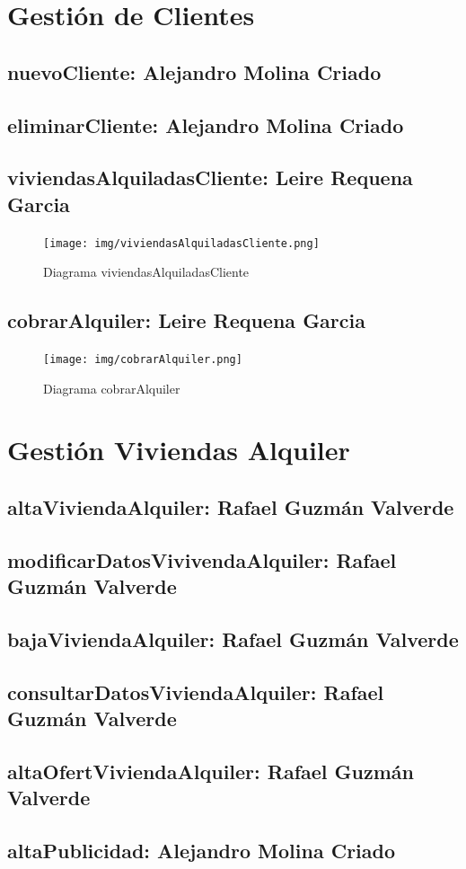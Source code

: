 \section{Gestión de Clientes}
\subsection{nuevoCliente: Alejandro Molina Criado}
\subsection{eliminarCliente: Alejandro Molina Criado}
\subsection{viviendasAlquiladasCliente: Leire Requena Garcia}
\begin{figure}[!h]
  \centering
    \texttt{[image: img/viviendasAlquiladasCliente.png]}
    \caption{Diagrama viviendasAlquiladasCliente}
\end{figure}
\subsection{cobrarAlquiler: Leire Requena Garcia}
\begin{figure}[!h]
  \centering
    \texttt{[image: img/cobrarAlquiler.png]}
    \caption{Diagrama cobrarAlquiler}
\end{figure}

\section{Gestión Viviendas Alquiler}
\subsection{altaViviendaAlquiler: Rafael Guzmán Valverde}
\subsection{modificarDatosVivivendaAlquiler: Rafael Guzmán Valverde}
\subsection{bajaViviendaAlquiler: Rafael Guzmán Valverde}
\subsection{consultarDatosViviendaAlquiler: Rafael Guzmán Valverde}
\subsection{altaOfertViviendaAlquiler: Rafael Guzmán Valverde}
\subsection{altaPublicidad: Alejandro Molina Criado}